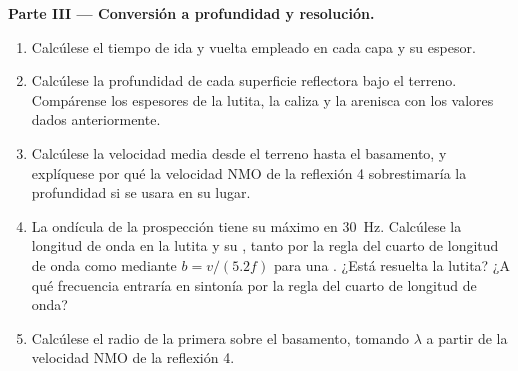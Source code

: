 \begin{problem}
\noindent\textbf{Parte III --- Conversión a profundidad y resolución.}
\begin{enumerate}[resume]
  \item Calcúlese el tiempo de ida y vuelta empleado en cada capa y su espesor.
  \item Calcúlese la profundidad de cada superficie reflectora bajo el terreno. Compárense
        los espesores de la lutita, la caliza y la arenisca con los valores
        dados anteriormente.
  \item Calcúlese la velocidad media desde el terreno hasta el basamento, y explíquese por qué
        la velocidad NMO de la reflexión 4 sobrestimaría la profundidad si se usara
        en su lugar.
  \item La ondícula de la prospección tiene su máximo en \qty{30}{Hz}. Calcúlese la longitud de onda en
        la lutita y su , tanto por la regla del cuarto de longitud de onda
        como mediante $b = v/(5.2f)$ para una . ¿Está resuelta la lutita?
        ¿A qué frecuencia entraría en sintonía por la regla del cuarto de longitud de onda?
  \item Calcúlese el radio de la primera  sobre el basamento, tomando
        $\lambda$ a partir de la velocidad NMO de la reflexión 4.
\end{enumerate}


\end{problem}
